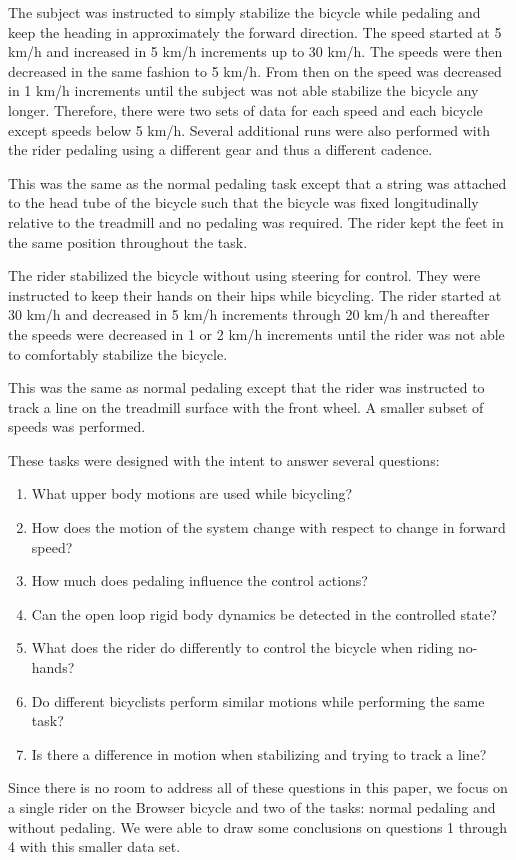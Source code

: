 \begin{description}
 \item[Normal pedaling] The subject was instructed to simply stabilize the bicycle while pedaling and keep the heading in approximately the forward direction. The speed started at 5 km/h and increased in 5 km/h increments up to 30 km/h. The speeds were then decreased in the same fashion to 5 km/h. From then on the speed was decreased in 1 km/h increments until the subject was not able stabilize the bicycle any longer. Therefore, there were two sets of data for each speed and each bicycle except speeds below 5 km/h. Several additional runs were also performed with the rider pedaling using a different gear and thus a different cadence.
 \item[Without pedaling] This was the same as the normal pedaling task except that a string was attached to the head tube of the bicycle such that the bicycle was fixed longitudinally relative to the treadmill and no pedaling was required. The rider kept the feet in the same position throughout the task.
 \item[No-hands] The rider stabilized the bicycle without using steering for control. They were instructed to keep their hands on their hips while bicycling. The rider started at 30 km/h and decreased in 5 km/h increments through 20 km/h and thereafter the speeds were decreased in 1 or 2 km/h increments until the rider was not able to comfortably stabilize the bicycle.
 \item[Line tracking] This was the same as normal pedaling except that the rider was instructed to track a line on the treadmill surface with the front wheel. A smaller subset of speeds was performed.
\end{description}
These tasks were designed with the intent to answer several questions:
\begin{enumerate}
    \item What upper body motions are used while bicycling?
    \item How does the motion of the system change with respect to change in forward speed?
    \item How much does pedaling influence the control actions?
    \item Can the open loop rigid body dynamics be detected in the controlled state?
    \item What does the rider do differently to control the bicycle when riding no-hands?
    \item Do different bicyclists perform similar motions while performing the same task?
    \item Is there a difference in motion when stabilizing and trying to track a line?
\end{enumerate}
Since there is no room to address all of these questions in this paper, we focus on a single rider on the Browser bicycle and two of the tasks: normal pedaling and without pedaling. We were able to draw some conclusions on questions 1 through 4 with this smaller data set.

